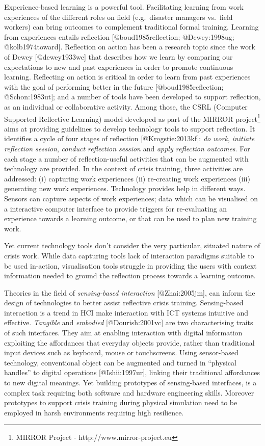 Experience-based learning is a powerful tool. Facilitating learning from
work experiences of the different roles on field (e.g.~disaster managers
vs.~field workers) can bring outcomes to complement traditional formal
training. Learning from experiences entails reflection
{[}@boud1985reflection; @Dewey:1998ug; @kolb1974toward{]}. Reflection on
action has been a research topic since the work of Dewey
{[}@dewey1933we{]} that describes how we learn by comparing our
expectations to new and past experiences in order to promote continuous
learning. Reflecting on action is critical in order to learn from past
experiences with the goal of performing better in the future
{[}@boud1985reflection; @Schon:1983ut{]}; and a number of tools have
been developed to support reflection, as an individual or collaborative
activity. Among those, the CSRL (Computer Supported Reflective Learning)
model developed as part of the MIRROR project\footnote{MIRROR Project -
  http://www.mirror-project.eu} aims at providing guidelines to develop
technology tools to support reflection. It identifies a cycle of four
stages of reflection {[}@Krogstie:2013kf{]}: \emph{do work},
\emph{initiate reflection session}, \emph{conduct reflection session}
and \emph{apply reflection outcomes}. For each stage a number of
reflection-useful activities that can be augmented with technology are
provided. In the context of crisis training, three activities are
addressed: (i) capturing work experiences (ii) re-creating work
experiences (iii) generating new work experiences. Technology provides
help in different ways. Sensors can capture aspects of work experiences;
data which can be visualised on a interactive computer interface to
provide triggers for re-evaluating an experience towards a learning
outcome, or that can be used to plan new training work.

Yet current technology tools don't consider the very particular,
situated nature of crisis work. While data capturing tools lack of
interaction paradigms suitable to be used in-action, visualisation tools
struggle in providing the users with context information needed to
ground the reflection process towards a learning outcome.

Theories in the field of \emph{sensing-based interaction}
{[}@Zhai:2005jm{]}, can inform the design of technologies to better
assist reflective crisis training. Sensing-based interaction is a trend
in HCI make interaction with ICT systems intuitive and effective.
\emph{Tangible} and \emph{embodied} {[}@Dourish:2001vc{]} are two
characterising traits of such interfaces. They aim at enabling
interaction with digital information exploiting the affordances that
everyday objects provide, rather than traditional input devices such as
keyboard, mouse or touchscreens. Using sensor-based technology,
conventional object can be augmented and turned in ``physical handles''
to digital operations {[}@Ishii:1997ur{]}, linking their traditional
affordances to new digital meanings. Yet
building prototypes of sensing-based interfaces, is a complex task
requiring both software and hardware engineering skills. Moreover
prototypes to support crisis training during physical simulation need to
be employed in harsh environments requiring high resilience.

